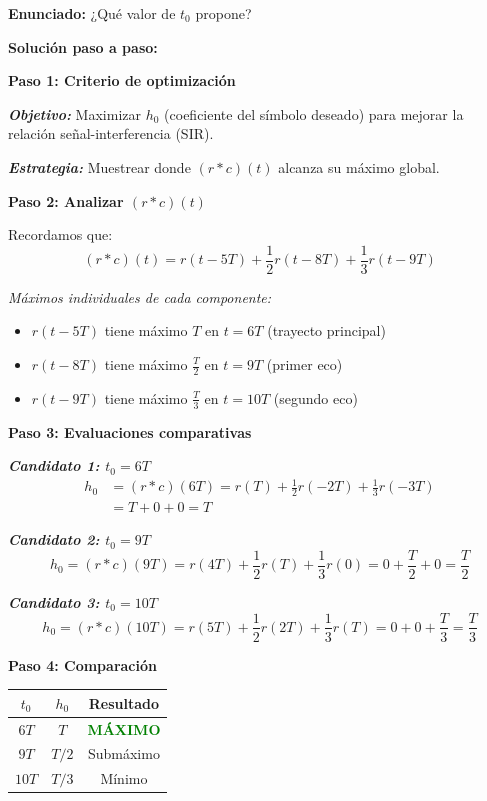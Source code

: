 \documentclass[11pt,a4paper]{article}
\begin{document}
\textbf{Enunciado:} ¿Qué valor de $t_0$ propone?

\vspace{0.3cm}
\textbf{Solución paso a paso:}

\textbf{Paso 1: Criterio de optimización}

\textit{\textbf{Objetivo:}} Maximizar $h_0$ (coeficiente del símbolo deseado) para mejorar la relación señal-interferencia (SIR).

\textit{\textbf{Estrategia:}} Muestrear donde $(r*c)(t)$ alcanza su máximo global.

\textbf{Paso 2: Analizar $(r * c)(t)$}

Recordamos que:
\[
(r * c)(t) = r(t-5T) + \frac{1}{2}r(t-8T) + \frac{1}{3}r(t-9T)
\]

\textit{Máximos individuales de cada componente:}
\begin{itemize}
    \item $r(t-5T)$ tiene máximo $T$ en $t = 6T$ (trayecto principal)
    \item $r(t-8T)$ tiene máximo $\frac{T}{2}$ en $t = 9T$ (primer eco)
    \item $r(t-9T)$ tiene máximo $\frac{T}{3}$ en $t = 10T$ (segundo eco)
\end{itemize}

\textbf{Paso 3: Evaluaciones comparativas}

\textit{\textbf{Candidato 1: $t_0 = 6T$}}
\begin{align*}
h_0 &= (r*c)(6T) = r(T) + \frac{1}{2}r(-2T) + \frac{1}{3}r(-3T) \\
&= T + 0 + 0 = T
\end{align*}

\textit{\textbf{Candidato 2: $t_0 = 9T$}}
\[
h_0 = (r*c)(9T) = r(4T) + \frac{1}{2}r(T) + \frac{1}{3}r(0) = 0 + \frac{T}{2} + 0 = \frac{T}{2}
\]

\textit{\textbf{Candidato 3: $t_0 = 10T$}}
\[
h_0 = (r*c)(10T) = r(5T) + \frac{1}{2}r(2T) + \frac{1}{3}r(T) = 0 + 0 + \frac{T}{3} = \frac{T}{3}
\]

\textbf{Paso 4: Comparación}

\begin{center}
\begin{tabular}{|c|c|c|}
\hline
\textbf{$t_0$} & \textbf{$h_0$} & \textbf{Resultado} \\
\hline
$6T$ & $T$ & \textcolor{green}{\textbf{MÁXIMO}} \\
$9T$ & $T/2$ & Submáximo \\
$10T$ & $T/3$ & Mínimo \\
\hline
\end{tabular}
\end{center}
\end{document}
